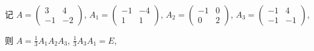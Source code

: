	 \paragraph{} %
		 记 $A = \begin{pmatrix}
				 3  & 4  \\
				 -1 & -2
			 \end{pmatrix}$, $A_1 = \begin{pmatrix}
				 -1 & -4 \\
				 1  & 1
			 \end{pmatrix}$, $A_2 = \begin{pmatrix}
				 -1 & 0 \\
				 0  & 2
			 \end{pmatrix}$, $A_3 = \begin{pmatrix}
				 -1 & 4  \\
				 -1 & -1
			 \end{pmatrix}$,

		 则 $A = \frac{1}{3} A_1 A_2 A_3$, $\frac{1}{3} A_3 A_1 = E$,

